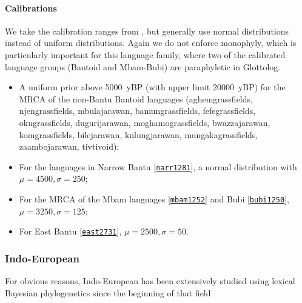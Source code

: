 \documentclass[a4paper,12pt]{scrartcl}
\newcommand{\glot}[2]{#1 {\scriptsize{[\texttt{\hyperlink{https://glottolog.org/resource/languoid/id/#2}{#2}}]}}}
\begin{document}
\paragraph{Calibrations}
We take the calibration ranges from \textcite{grollemund2015bantu}, but generally use normal distributions instead of uniform distributions. Again we do not enforce monophyly, which is particularly important for this language family, where two of the calibrated language groups (Bantoid and Mbam-Bubi) are paraphyletic in Glottolog.
\begin{itemize}
\item A uniform prior above 5000~yBP (with upper limit 20000~yBP) for the MRCA of the non-Bantu Bantoid languages (aghemgrassfields, njengrassfields, mbulajarawan, bamungrassfields, fefegrassfields, okugrassfields, dugurijarawan, moghamograssfields, bwazzajarawan, komgrassfields, bilejarawan, kulungjarawan, mungakagrassfields, zaambojarawan, tivtivoid);
\item For the languages in \glot{Narrow Bantu}{narr1281}, a normal distribution with $\mu=4500, \sigma=250$;
\item For the MRCA of the \glot{Mbam languages}{mbam1252} and \glot{Bubi}{bubi1250}, $\mu=3250, \sigma=125$;
\item For \glot{East Bantu}{east2731}, $\mu=2500, \sigma=50$.
\end{itemize}

\subsubsection{Indo-European}
For obvious reasons, Indo-European has been extensively studied using lexical Bayesian phylogenetics since the beginning
of that field
\parencite{bouckaert2012mapping,chang2015ancestryconstrained,gray2003language,holm2017steppe,rama2018three,willems2016using}
\end{document}
